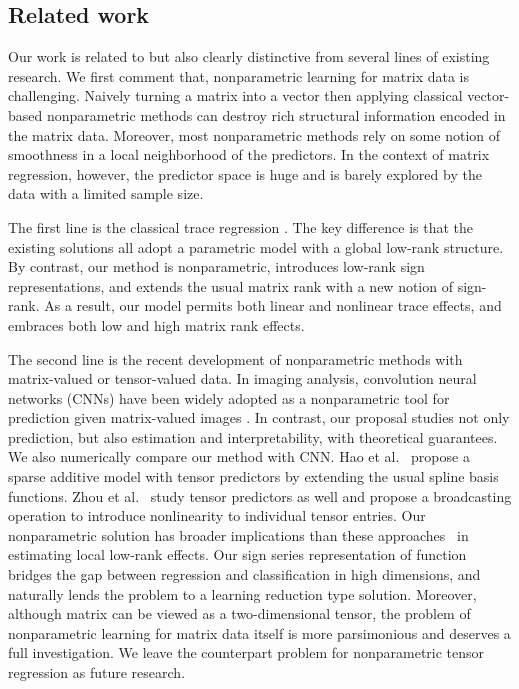 \documentclass[aos]{imsart}
\theoremstyle{definition}
\begin{document}
\subsection{Related work}

Our work is related to but also clearly distinctive from several lines of existing research. We first comment that, nonparametric learning for matrix data is challenging. Naively turning a matrix into a vector then applying classical vector-based nonparametric methods can destroy rich structural information encoded in the matrix data. Moreover, most nonparametric methods rely on some notion of smoothness in a local neighborhood of the predictors. In the context of matrix regression, however, the predictor space is huge and is barely explored by the data with a limited sample size.  

The first line is the classical trace regression \citep{fan2019generalized,hamidi2019low}. The key difference is that the existing solutions all adopt a parametric model with a global low-rank structure. By contrast, our method is nonparametric, introduces low-rank sign representations, and extends the usual matrix rank with a new notion of sign-rank. As a result, our model permits both linear and nonlinear trace effects, and embraces both low and high matrix rank effects. 
 
The second line is the recent development of nonparametric methods with matrix-valued or tensor-valued data. In imaging analysis, convolution neural networks (CNNs) have been widely adopted as a nonparametric tool for prediction given matrix-valued images \citep{goodfellow2016deep}. In contrast, our proposal studies not only prediction, but also estimation and interpretability, with theoretical guarantees. We also numerically compare our method with CNN. Hao et al.~\citep{hao2019sparse} propose a sparse additive model with tensor predictors by extending the usual spline basis functions. Zhou et al.~\citep{zhou2020broadcasted} study tensor predictors as well and propose a broadcasting operation to introduce nonlinearity to individual tensor entries. Our nonparametric solution has broader implications than these approaches~\cite{hao2019sparse, zhou2020broadcasted} in estimating local low-rank effects. Our sign series representation of function bridges the gap between regression and classification in high dimensions, and naturally lends the problem to a learning reduction type solution. Moreover, although matrix can be viewed as a two-dimensional tensor, the problem of nonparametric learning for matrix data itself is more parsimonious and deserves a full investigation. We leave the counterpart problem for nonparametric tensor regression as future research. 
\end{document}
